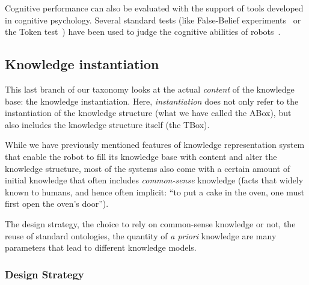 Cognitive performance can also be evaluated with the support of tools developed
in cognitive psychology. Several standard tests (like False-Belief
experiments~\cite{Leslie2000} or the Token test~\cite{DiSimoni1978}) have been
used to judge the cognitive abilities of robots~\cite{Mavridis2006,
Breazeal2006}.
\subsection{Knowledge instantiation}

\begin{scriptsize}
\begin{center}
\end{center}
\end{scriptsize}

This last branch of our taxonomy looks at the actual \emph{content} of the
knowledge base: the knowledge instantiation. Here, \emph{instantiation} does
not only refer to the instantiation of the knowledge structure (what we have
called the ABox), but also includes the knowledge structure itself (the TBox).

While we have previously mentioned features of knowledge representation system
that enable the robot to fill its knowledge base with content and alter the
knowledge structure, most of the systems also come with a certain amount of
initial knowledge that often includes \emph{common-sense} knowledge (\ie facts
that widely known to humans, and hence often implicit: ``to put a cake in the
oven, one must first open the oven's door'').

The design strategy, the choice to rely on common-sense knowledge or not, the
reuse of standard ontologies, the quantity of {\it a priori} knowledge are many
parameters that lead to different knowledge models.


\subsubsection{Design Strategy}
\label{sect|design-strategies}

